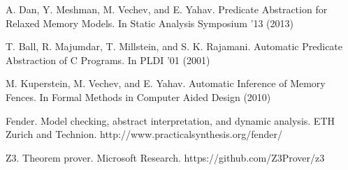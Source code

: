 \documentclass{article}
\begin{document}
\begin{thebibliography}{9}

		A. Dan, Y. Meshman, M. Vechev, and E. Yahav. Predicate Abstraction for Relaxed Memory Models. In Static Analysis Symposium '13 (2013)
	
		T. Ball, R. Majumdar, T. Millstein, and S. K. Rajamani. Automatic Predicate Abstraction of C Programs. In PLDI '01 (2001)
	
		M. Kuperstein, M. Vechev, and E. Yahav. Automatic Inference of Memory Fences. In Formal Methods in Computer Aided Design (2010)
		
		Fender. Model checking, abstract interpretation, and dynamic analysis. ETH Zurich and Technion. http://www.practicalsynthesis.org/fender/
		
		Z3. Theorem prover. Microsoft Research. https://github.com/Z3Prover/z3

\end{thebibliography}
\end{document}
